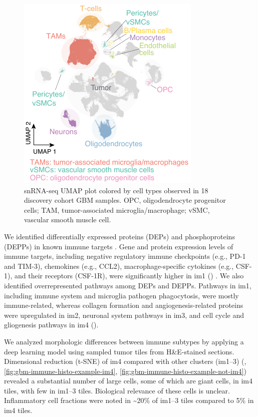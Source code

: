 \begin{figure}[tb]
    \centering
    \includegraphics[width=0.5\linewidth]{figures/chap04_cptac_gbm_discov/figure4_immune_single_cell.pdf}
    \caption[Overview of the snRNA-seq cell type annotation.]{%
        snRNA-seq UMAP plot colored by cell types observed in 18 discovery cohort GBM samples. OPC, oligodendrocyte progenitor cells; TAM, tumor-associated microglia/macrophage; vSMC, vascular smooth muscle cell.
    }
    \label{fig:gbm-single-cell-umap}
\end{figure}

We identified differentially expressed proteins (DEPs) and phosphoproteins (DEPPs) in known immune targets \cite{chenz_hambardzumyand:ImmuneMicroenvironment2018}. Gene and protein expression levels of immune targets, including negative regulatory immune checkpoints (e.g., PD-1 and TIM-3), chemokines (e.g., CCL2), macrophage-specific cytokines (e.g., CSF-1), and their receptors (CSF-1R), were significantly higher in im1 () \cite{butowskin_pradosm:OrallyAdministered2016}. We also identified overrepresented pathways among DEPs and DEPPs. Pathways in im1, including immune system and microglia pathogen phagocytosis, were mostly immune-related, whereas collagen formation and angiogenesis-related proteins were upregulated in im2, neuronal system pathways in im3, and cell cycle and gliogenesis pathways in im4 ().

We analyzed morphologic differences between immune subtypes by applying a deep learning model using sampled tumor tiles from H\&E-stained sections. Dimensional reduction (t-SNE) of im4 compared with other clusters (im1--3) (, \ref{fig:gbm-immune-histo-example-im4}, \ref{fig:gbm-immune-histo-example-not-im4}) revealed a substantial number of large cells, some of which are giant cells, in im4 tiles, with few in im1--3 tiles. Biological relevance of these cells is unclear. Inflammatory cell fractions were noted in \textasciitilde20\% of im1--3 tiles compared to 5\% in im4 tiles.


